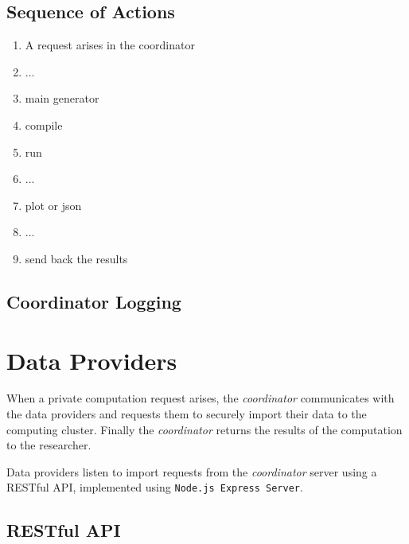 \subsection{Sequence of Actions}\label{ss:coordinator-sequence}


\begin{enumerate}
\item A request arises in the coordinator
\item ...
\item main generator
\item compile
\item run
\item ...
\item plot or json
\item ...
\item send back the results
\end{enumerate}


\subsection{Coordinator Logging}\label{ss:coordinator-logging}




\section{Data Providers}\label{s:impl-data-providers}
When a private computation request arises, the \textit{coordinator} communicates with the data providers and requests them to securely import their data to the computing cluster.
Finally the \textit{coordinator} returns the results of the computation to the researcher.

Data providers listen to import requests from the \textit{coordinator} server using a RESTful API, implemented using \texttt{Node.js Express Server}.



\subsection{RESTful API}\label{ss:data-providers-restful-api}


